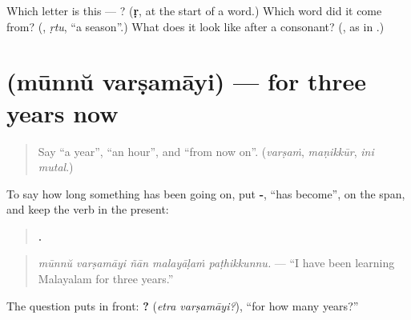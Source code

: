 \begin{tcolorbox}[breakable,colback=teal!4,colframe=teal!35!black,title={Before you move on}]
Which letter is this — ? (\textbf{ṛ}, at the start of a word.) Which word did it come from? (\textbf{}, \emph{ṛtu}, \textquotedblleft{}a season\textquotedblright{}.) What does it look like after a consonant? (\textbf{}, as in \textbf{}.)
\end{tcolorbox}
\section[\texorpdfstring{\ml{മൂന്ന്} \ml{വർഷമായി} (mūnnŭ varṣamāyi)}{മൂന്ന് വർഷമായി (mūnnŭ varṣamāyi)}]{  (mūnnŭ varṣamāyi) — for three years now}

\label{lesson:ML-C346-varsamayi}



\begin{quote}
Say \textquotedblleft{}a year\textquotedblright{}, \textquotedblleft{}an hour\textquotedblright{}, and \textquotedblleft{}from now on\textquotedblright{}. (\emph{varṣaṁ}, \emph{maṇikkūr}, \emph{ini mutal}.)
\end{quote}

\begin{grammarlens}[title={Grammar Lens: a span with -\ml{ആയി}, still running}]
To say how long something has been going on, put \textbf{-}, \textquotedblleft{}has become\textquotedblright{}, on the span, and keep the verb in the present:

\begin{quote}
\textbf{    .}
\end{quote}

\begin{quote}
\emph{mūnnŭ varṣamāyi ñān malayāḷaṁ paṭhikkunnu.} — \textquotedblleft{}I have been learning Malayalam for three years.\textquotedblright{}
\end{quote}

The question puts \textbf{} in front: \textbf{ ?} (\emph{etra varṣamāyi?}), \textquotedblleft{}for how many years?\textquotedblright{}
\end{grammarlens}

